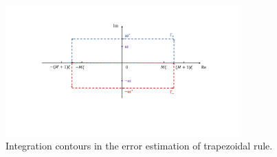 \begin{figure}[!ht]
    \begin{center}
    \includegraphics[width=0.8\textwidth]{figs/Trapezoidal.pdf}
    \caption{Integration contours in the error estimation of trapezoidal rule.}
    \label{fig:Trapezoidal}
    \end{center} 
\end{figure}